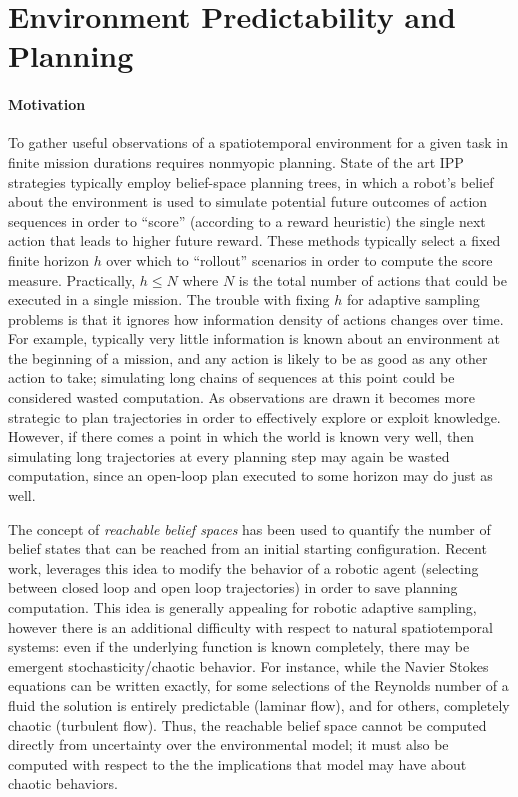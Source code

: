 \section{Environment Predictability and Planning}

\paragraph{Motivation}
To gather useful observations of a spatiotemporal environment for a given task in finite mission durations requires nonmyopic planning.
State of the art IPP strategies typically employ belief-space planning trees, in which a robot's belief about the environment is used to simulate potential future outcomes of action sequences in order to ``score'' (according to a reward heuristic) the single next action that leads to higher future reward\autocite{sunberg2018online,morere2018continuous,Arora2017}.
These methods typically select a fixed finite horizon $h$ over which to ``rollout'' scenarios in order to compute the score measure.
Practically, $h \leq N$ where $N$ is the total number of actions that could be executed in a single mission.
The trouble with fixing $h$ for adaptive sampling problems is that it ignores how information density of actions changes over time.
For example, typically very little information is known about an environment at the beginning of a mission, and any action is likely to be as good as any other action to take; simulating long chains of sequences at this point could be considered wasted computation.
As observations are drawn it becomes more strategic to plan trajectories in order to effectively explore or exploit knowledge.
However, if there comes a point in which the world is known very well, then simulating long trajectories at every planning step may again be wasted computation, since an open-loop plan executed to some horizon may do just as well.

The concept of \emph{reachable belief spaces}\autocite{kurniawati2008sarsop} has been used to quantify the number of belief states that can be reached from an initial starting configuration.
Recent work\autocite{flaspohler2020belief}, leverages this idea to modify the behavior of a robotic agent (selecting between closed loop and open loop trajectories) in order to save planning computation.
This idea is generally appealing for robotic adaptive sampling, however there is an additional difficulty with respect to natural spatiotemporal systems: even if the underlying function is known completely, there may be emergent stochasticity/chaotic behavior.
For instance, while the Navier Stokes equations can be written exactly, for some selections of the Reynolds number of a fluid the solution is entirely predictable (laminar flow), and for others, completely chaotic (turbulent flow).
Thus, the reachable belief space cannot be computed directly from uncertainty over the environmental model; it must also be computed with respect to the the implications that model may have about chaotic behaviors.

